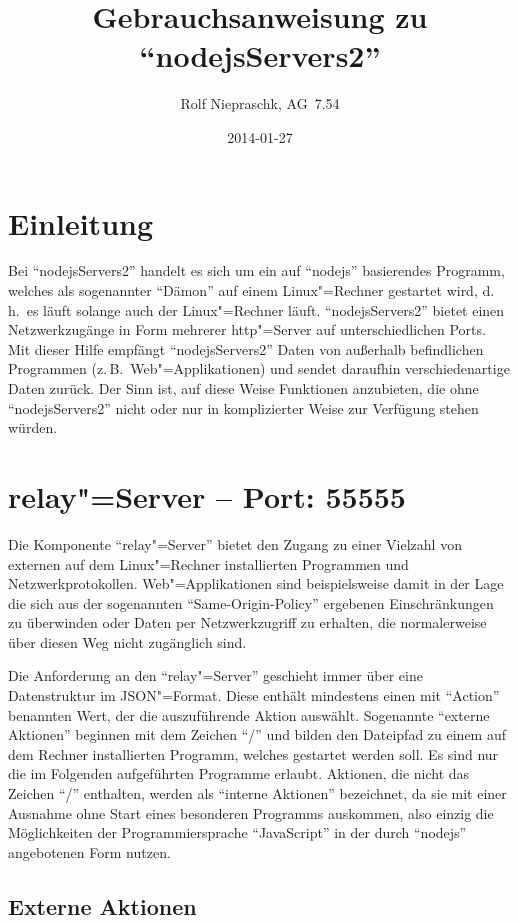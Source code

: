 \documentclass[%
fontsize=11pt
,paper=a4
,twoside
,headings=normal
,numbers=endperiod
,pagesize
]{scrartcl}
\title{Gebrauchsanweisung zu "`nodejsServers2"'}
\date{2014-01-27}
\author{Rolf Niepraschk, AG~7.54}
\begin{document}
\maketitle

\section*{Einleitung}

Bei "`nodejsServers2"' handelt es sich um ein auf "`nodejs"' basierendes
Programm, welches als sogenannter "`Dämon"' auf einem Linux"=Rechner
gestartet wird, d.\,h.\ es läuft solange auch der Linux"=Rechner läuft.
"`nodejsServers2"' bietet einen Netzwerkzugänge in Form mehrerer
http"=Server auf unterschiedlichen Ports. Mit dieser Hilfe empfängt
"`nodejsServers2"' Daten von außerhalb befindlichen Programmen (z.\,B.\
Web"=Applikationen) und sendet daraufhin verschiedenartige Daten zurück. Der
Sinn ist, auf diese Weise Funktionen anzubieten, die ohne "`nodejsServers2"'
nicht oder nur in komplizierter Weise zur Verfügung stehen würden.

\section{relay"=Server -- Port: 55555}

Die Komponente "`relay"=Server"' bietet den Zugang zu einer Vielzahl von
externen auf dem Linux"=Rechner installierten Programmen und
Netzwerkprotokollen. Web"=Applikationen sind beispielsweise damit in der Lage
die sich aus der sogenannten "`Same-Origin-Policy"' ergebenen
Einschränkungen zu überwinden oder Daten per Netzwerkzugriff zu erhalten,
die normalerweise über diesen Weg nicht zugänglich sind.

Die Anforderung an den "`relay"=Server"' geschieht immer über eine
Datenstruktur im JSON"=Format. Diese enthält mindestens einen mit "`Action"'
benannten Wert, der die auszuführende Aktion auswählt. Sogenannte "`externe
Aktionen"' beginnen mit dem Zeichen "`/"' und bilden den Dateipfad zu einem
auf dem Rechner installierten Programm, welches gestartet werden soll.
Es sind nur die im Folgenden aufgeführten Programme erlaubt. Aktionen, die
nicht das Zeichen "`/"' enthalten, werden als "`interne Aktionen"'
bezeichnet, da sie mit einer Ausnahme ohne Start eines besonderen Programms
auskommen, also einzig die Möglichkeiten der Programmiersprache
"`JavaScript"' in der durch "`nodejs"' angebotenen Form nutzen.

\subsection{Externe Aktionen}
\end{document}
